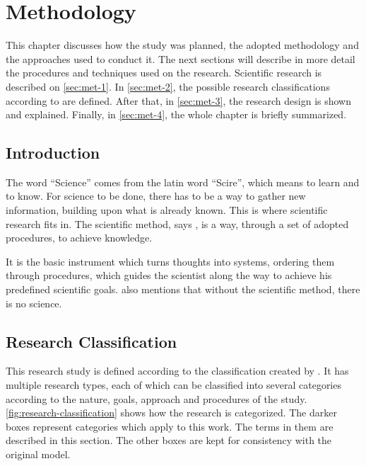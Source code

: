 \chapter{Methodology}\label{methodology}

This chapter discusses how the study was planned, the adopted methodology and the approaches used to conduct it. The next sections will describe in more detail the procedures and techniques used on the research. Scientific research is described on \autoref{sec:met-1}. In \autoref{sec:met-2}, the possible research classifications according to \cite{Prodanov:2013} are defined. After that, in \autoref{sec:met-3}, the research design is shown and explained. Finally, in \autoref{sec:met-4}, the whole chapter is briefly summarized.

\section{Introduction}\label{sec:met-1}

The word ``Science'' comes from the latin word ``Scire'', which means to learn and to know. For science to be done, there has to be a way to gather new information, building upon what is already known. This is where scientific research fits in. The scientific method, says \cite{Prodanov:2013}, is a way, through a set of adopted procedures, to achieve knowledge.

It is the basic instrument which turns thoughts into systems, ordering them through procedures, which guides the scientist along the way to achieve his predefined scientific goals. \cite{Prodanov:2013} also mentions that without the scientific method, there is no science.

\section{Research Classification}\label{sec:met-2}

This research study is defined according to the classification created by \cite{Prodanov:2013}. It has multiple research types, each of which can be classified into several categories according to the nature, goals, approach and procedures of the study. \autoref{fig:research-classification} shows how the research is categorized. The darker boxes represent categories which apply to this work. The terms in them are described in this section. The other boxes are kept for consistency with the original model.

